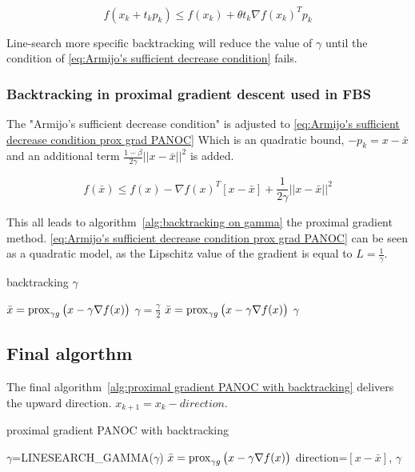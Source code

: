 			\begin{equation}
			f(x_k + t_kp_k) \leq f(x_k) + \theta t_k \nabla f(x_k)^Tp_k
			\label{eq:Armijo's sufficient decrease condition}
			\end{equation}
			
			Line-search more specific backtracking will reduce the value of $\gamma$ until the condition of \eqref{eq:Armijo's sufficient decrease condition} fails.
			
		\subsubsection{Backtracking in proximal gradient descent used in FBS}
			The  "Armijo's sufficient decrease condition" is adjusted to \eqref{eq:Armijo's sufficient decrease condition prox grad PANOC} Which is an quadratic bound, $-p_k=x-\bar{x}$ and an additional term $\frac{1-\beta}{2 \gamma}||x-\bar{x}||^2$ is added.
			
			\begin{equation}
			f({\bar{x}}) \leq f(x) - \nabla f(x)^T[x-\bar{x}] + \frac{1}{2 \gamma}||x-\bar{x}||^2
			\label{eq:Armijo's sufficient decrease condition prox grad PANOC}
			\end{equation}
			
			This all leads to algorithm~\ref{alg:backtracking on gamma} the proximal gradient method. \eqref{eq:Armijo's sufficient decrease condition prox grad PANOC} can be seen as a quadratic model, as the Lipschitz value of the gradient is equal to $L=\frac{1}{\gamma}$.
			
			\begin{algorithm}
				\caption{backtracking $\gamma$}
				\label{alg:backtracking on gamma}
				\begin{algorithmic}[1]
					\State $\bar{x} = \operatorname{prox}_{\gamma g}\big( x- \gamma \nabla f(x)\big)$
					\State $\gamma = \frac{\gamma}{2}$
					\State $\bar{x} = \operatorname{prox}_{\gamma g}\big( x- \gamma \nabla f(x)\big)$
					\EndWhile
					\State \Return $\gamma$
					\EndProcedure
				\end{algorithmic}
			\end{algorithm}
	\subsection{Final algorthm}
		The final algorithm~\ref{alg:proximal gradient PANOC with backtracking} delivers the upward direction. $x_{k+1}=x_k - direction$.
		\begin{algorithm}
			\caption{proximal gradient PANOC with backtracking}
			\label{alg:proximal gradient PANOC with backtracking}
			\begin{algorithmic}[1]
				\Procedure{get\_proximal\_gradient\_step}{x,$\gamma$}
				\State $\gamma$=LINESEARCH\_GAMMA($\gamma$)
				\State $\bar{x} = \operatorname{prox}_{\gamma g}\big( x- \gamma \nabla f(x)\big)$
				\State \Return direction=$[x-\bar{x}]$, $\gamma$
				\EndProcedure
			\end{algorithmic}
		\end{algorithm}